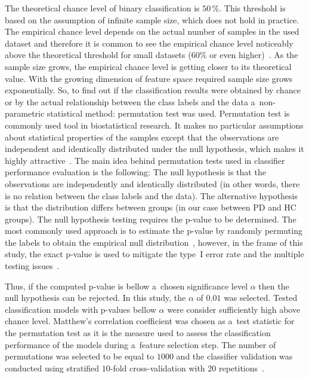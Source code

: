 The theoretical chance level of binary classification is $50$\,\%. This threshold is based on the assumption of infinite sample size, which does not hold in practice. The empirical chance level depends on the actual number of samples in the used dataset and therefore it is common to see the empirical chance level noticeably above the theoretical threshold for small datasets ($60$\% or even higher)~\cite{Combrisson2015}. As the sample size grows, the empirical chance level is getting closer to its theoretical value. With the growing dimension of feature space required sample size grows exponentially. So, to find out if the classification results were obtained by chance or by the actual relationship between the class labels and the data a~non-parametric statistical method: permutation test was used. Permutation test is commonly used tool in biostatistical research. It makes no particular assumptions about statistical properties of the samples except that the observations are independent and identically distributed under the null hypothesis, which makes it highly attractive~\cite{Phipson2010}. The main idea behind permutation tests used in classifier performance evaluation is the following: The null hypothesis is that the observations are independently and identically distributed (in other words, there is no relation between the class labels and the data). The alternative hypothesis is that the distribution differs between groups (in our case between PD and HC groups). The null hypothesis testing requires the p-value to be determined. The most commonly used approach is to estimate the p-value by randomly permuting the labels to obtain the empirical null distribution~\cite{Phipson2010}, however, in the frame of this study, the exact p-value is used to mitigate the type~I error rate and the multiple testing issues~\cite{Phipson2010}.

Thus, if the computed p-value is bellow a~chosen significance level $\alpha$ then the null hypothesis can be rejected. In this study, the $\alpha$ of $0.01$ was selected. Tested classification models with p-values bellow $\alpha$ were consider sufficiently high above chance level. Matthew's correlation coefficient was chosen as a~test statistic for the permutation test as it is the measure used to assess the classification performance of the models during a~feature selection step. The number of permutations was selected to be equal to $1000$ and the classifier validation was conducted using stratified $10$-fold cross-validation with $20$ repetitions~\cite{Ojala2009, Combrisson2015}.

